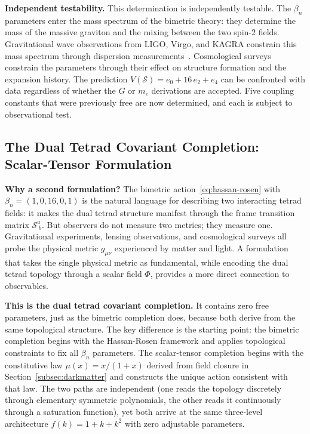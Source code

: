 \documentclass[aps,prd,preprint,superscriptaddress,showpacs,preprintnumbers,amsmath,amssymb,nofootinbib]{revtex4-2}
\begin{document}
\textbf{Independent testability.} This determination is independently testable. The $\beta_n$ parameters enter the mass spectrum of the bimetric theory: they determine the mass of the massive graviton and the mixing between the two spin-2 fields. Gravitational wave observations from LIGO, Virgo, and KAGRA constrain this mass spectrum through dispersion measurements~\cite{gw170817}. Cosmological surveys constrain the parameters through their effect on structure formation and the expansion history. The prediction $V(\mathcal{S}) = e_0 + 16\,e_2 + e_4$ can be confronted with data regardless of whether the $G$ or $m_e$ derivations are accepted. Five coupling constants that were previously free are now determined, and each is subject to observational test.

\subsection{The Dual Tetrad Covariant Completion: Scalar-Tensor Formulation}
\label{subsec:scalar-tensor}

\textbf{Why a second formulation?} The bimetric action~\eqref{eq:hassan-rosen} with $\beta_n = (1, 0, 16, 0, 1)$ is the natural language for describing two interacting tetrad fields: it makes the dual tetrad structure manifest through the frame transition matrix $\mathcal{S}^a_{\;b}$. But observers do not measure two metrics; they measure one. Gravitational experiments, lensing observations, and cosmological surveys all probe the physical metric $g_{\mu\nu}$ experienced by matter and light. A formulation that takes the single physical metric as fundamental, while encoding the dual tetrad topology through a scalar field $\Phi$, provides a more direct connection to observables.

\textbf{This is the dual tetrad covariant completion.} It contains zero free parameters, just as the bimetric completion does, because both derive from the same topological structure. The key difference is the starting point: the bimetric completion begins with the Hassan-Rosen framework and applies topological constraints to fix all $\beta_n$ parameters. The scalar-tensor completion begins with the constitutive law $\mu(x) = x/(1+x)$ derived from field closure in Section~\ref{subsec:darkmatter} and constructs the unique action consistent with that law. The two paths are independent (one reads the topology discretely through elementary symmetric polynomials, the other reads it continuously through a saturation function), yet both arrive at the same three-level architecture $f(k) = 1 + k + k^2$ with zero adjustable parameters.
\end{document}
